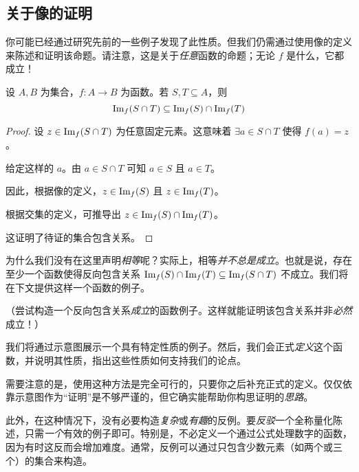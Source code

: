 
\subsection{关于像的证明}

你可能已经通过研究先前的一些例子发现了此性质。但我们仍需通过使用像的定义来陈述和证明该命题。请注意，这是关于\emph{任意}函数的命题；无论 $f$ 是什么，它都成立！

\begin{proposition}\label{prop:proposition7.3.6}
    设 $A, B$ 为集合，$f:A \to B$ 为函数。若 $S, T \subseteq A$，则
    \[\text{Im}_f (S \cap T) \subseteq \text{Im}_f (S) \cap \text{Im}_f (T)\]
\end{proposition}

\begin{proof}
    设 $z \in \text{Im}_f (S \cap T)$ 为任意固定元素。这意味着 $\exists a \in S \cap T$ 使得 $f(a) = z$。
    
    给定这样的 $a$。由 $a \in S \cap T$ 可知 $a \in S$ 且 $a \in T$。

    因此，根据像的定义，$z \in \text{Im}_f (S)$ 且 $z \in \text{Im}_f (T)$。

    根据交集的定义，可推导出 $z \in \text{Im}_f (S) \cap \text{Im}_f (T)$。

    这证明了待证的集合包含关系。
\end{proof}

为什么我们没有在这里声明\emph{相等}呢？实际上，相等\emph{并不总是成立}。也就是说，存在至少一个函数使得反向包含关系 $\text{Im}_f(S) \cap \text{Im}_f(T) \subseteq \text{Im}_f(S \cap T)$ 不成立。我们将在下文提供这样一个函数的例子。

（尝试构造一个反向包含关系\emph{成立}的函数例子。这样就能证明该包含关系并非\emph{必然}成立！）

我们将通过示意图展示一个具有特定性质的例子。然后，我们会正式\emph{定义}这个函数，并说明其性质，指出这些性质如何支持我们的论点。

需要注意的是，使用这种方法是完全可行的，只要你之后补充正式的定义。仅仅依靠示意图作为``证明''是不够严谨的，但它确实能帮助你构思证明的\emph{思路}。

此外，在这种情况下，没有必要构造\emph{复杂}或\emph{有趣}的反例。要\emph{反驳}一个全称量化陈述，只需\emph{一个}有效的例子即可。特别是，不必定义一个通过公式处理数字的函数，因为有时这反而会增加难度。通常，反例可以通过只包含少数元素（如两个或三个）的集合来构造。

